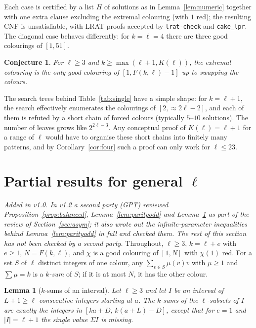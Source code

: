 \documentclass[11pt]{amsart}
\newtheorem{lemma}[theorem]{Lemma}
\newtheorem{conjecture}[theorem]{Conjecture}
\theoremstyle{definition}
\newcommand{\F}{F}
\begin{document}
\noindent Each case is certified by a list $H$ of solutions as in Lemma~\ref{lem:numeric} together with one extra clause excluding the extremal colouring (with $1$ red); the resulting CNF is unsatisfiable, with LRAT proofs accepted by \texttt{lrat-check} and \texttt{cake\_lpr}. The diagonal case behaves differently: for $k=\ell=4$ there are three good colourings of $[1,51]$.

\begin{conjecture}\label{conj:unique}
For $\ell\ge3$ and $k\ge\max(\ell+1,K(\ell))$, the extremal colouring is the only good colouring of $[1,\F(k,\ell)-1]$ up to swapping the colours.
\end{conjecture}

\noindent The search trees behind Table~\ref{tab:single} have a simple shape: for $k=\ell+1$, the search effectively enumerates the colourings of $[2,\approx2\ell-2]$, and each of them is refuted by a short chain of forced colours (typically $5$--$10$ solutions). The number of leaves grows like $2^{2\ell-3}$. Any conceptual proof of $K(\ell)=\ell+1$ for a range of $\ell$ would have to organise these short chains into finitely many patterns, and by Corollary~\ref{cor:four} such a proof can only work for $\ell\le23$.

\section{Partial results for general $\ell$}\label{sec:general}

\noindent\emph{Added in v1.0. In v1.2 a second party (GPT) reviewed Proposition~\ref{prop:balanced}, Lemma~\ref{lem:parityodd} and Lemma~\ref{lem:interval} as part of the review of Section~\ref{sec:asym}; it also wrote out the infinite-parameter inequalities behind Lemma~\ref{lem:parityodd} in full and checked them. The rest of this section has not been checked by a second party.} Throughout, $\ell\ge3$, $k=\ell+e$ with $e\ge1$, $N=\F(k,\ell)$, and $\chi$ is a good colouring of $[1,N]$ with $\chi(1)$ red. For a set $S$ of $\ell$ distinct integers of one colour, any $\sum_{v\in S}\mu(v)v$ with $\mu\ge1$ and $\sum\mu=k$ is a \emph{$k$-sum} of $S$; if it is at most $N$, it has the other colour.

\begin{lemma}[$k$-sums of an interval]\label{lem:interval}
Let $\ell\ge3$ and let $I$ be an interval of $L+1\ge\ell$ consecutive integers starting at $a$. The $k$-sums of the $\ell$-subsets of $I$ are exactly the integers in $[ka+D,\,k(a+L)-D]$, except that for $e=1$ and $|I|=\ell+1$ the single value $\Sigma I$ is missing.
\end{lemma}
\end{document}
